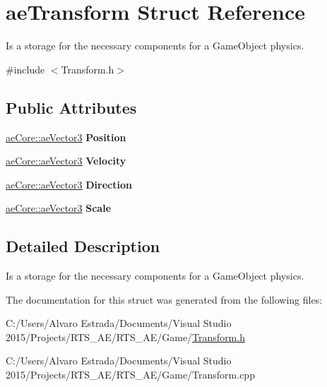 \hypertarget{structae_transform}{}\section{ae\+Transform Struct Reference}
\label{structae_transform}


Is a storage for the necessary components for a Game\+Object physics.  




{\ttfamily \#include $<$Transform.\+h$>$}

\subsection*{Public Attributes}
\begin{DoxyCompactItemize}
\item 
\hyperlink{structae_core_1_1ae_vector3}{ae\+Core\+::ae\+Vector3} {\bfseries Position}\hypertarget{structae_transform_a8c34eee85f9fd54dad0e5c2c87cd82ff}{}\label{structae_transform_a8c34eee85f9fd54dad0e5c2c87cd82ff}

\item 
\hyperlink{structae_core_1_1ae_vector3}{ae\+Core\+::ae\+Vector3} {\bfseries Velocity}\hypertarget{structae_transform_acebbcda61af0dc18894b1ffb7845ac1b}{}\label{structae_transform_acebbcda61af0dc18894b1ffb7845ac1b}

\item 
\hyperlink{structae_core_1_1ae_vector3}{ae\+Core\+::ae\+Vector3} {\bfseries Direction}\hypertarget{structae_transform_adecd5e97a7612957cf5f707b55802c97}{}\label{structae_transform_adecd5e97a7612957cf5f707b55802c97}

\item 
\hyperlink{structae_core_1_1ae_vector3}{ae\+Core\+::ae\+Vector3} {\bfseries Scale}\hypertarget{structae_transform_ac50ef3c1832ed4fbb4601192069f1ba7}{}\label{structae_transform_ac50ef3c1832ed4fbb4601192069f1ba7}

\end{DoxyCompactItemize}


\subsection{Detailed Description}
Is a storage for the necessary components for a Game\+Object physics. 

The documentation for this struct was generated from the following files\+:\begin{DoxyCompactItemize}
\item 
C\+:/\+Users/\+Alvaro Estrada/\+Documents/\+Visual Studio 2015/\+Projects/\+R\+T\+S\+\_\+\+A\+E/\+R\+T\+S\+\_\+\+A\+E/\+Game/\hyperlink{_transform_8h}{Transform.\+h}\item 
C\+:/\+Users/\+Alvaro Estrada/\+Documents/\+Visual Studio 2015/\+Projects/\+R\+T\+S\+\_\+\+A\+E/\+R\+T\+S\+\_\+\+A\+E/\+Game/Transform.\+cpp\end{DoxyCompactItemize}
